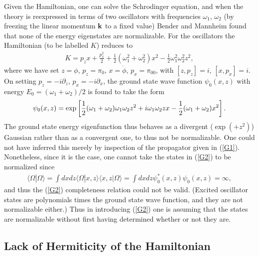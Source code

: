 \documentclass[aps]{revtex4}
\begin{document}
Given the Hamiltonian, one can solve the Schrodinger equation, and when the theory is reexpressed in terms of two oscillators with frequencies $\omega_1$, $\omega_2$ (by freezing the linear momentum ${\bf k}$ to a fixed value) Bender and Mannheim found \cite{Bender2008a} that none of the energy eigenstates are normalizable. For the oscillators the Hamiltonian (to be labelled $K$) reduces to 
%
\begin{eqnarray}
K=p_zx+\frac{p_x^2}{2}+\frac{1}{2}\left(\omega_1^2+\omega_2^2 \right)x^2-\frac{1}{2}\omega_1^2\omega_2^2z^2,
\label{G9}
\end{eqnarray}
% 
where we have set  $z=\phi$, $p_z=\pi_0$, $x=\dot{\phi}$, $p_x=\pi_{00}$,  with $[z,p_z]=i$, $[x,p_x]=i$.
On setting $p_z=-i\partial_z$, $p_x=-i\partial_x$,  the ground state wave function $\psi_0(x,z)$ with energy $E_0=(\omega_1+\omega_2)/2$ is found to take the form
%
\begin{eqnarray}
\psi_0(x,z)={\rm exp}\left[\frac{1}{2}(\omega_1+\omega_2)\omega_1\omega_2
z^2+i\omega_1\omega_2zx-\frac{1}{2}(\omega_1+\omega_2)x^2\right].
\label{G10}
\end{eqnarray}
%
The ground state energy eigenfunction thus behaves as a divergent ($\exp(+z^2)$) Gaussian rather than as a convergent one, to thus not be normalizable. One could not have inferred this merely by inspection of the propagator given in (\ref{G1}). Nonetheless, since it is the case, one cannot take the states in (\ref{G2}) to be normalized since  
%
\begin{eqnarray}
\langle\Omega|\Omega\rangle=\int dxdz\langle\Omega|x,z\rangle\langle x,z| \Omega\rangle
=\int dxdz\psi^*_0(x,z)\psi_0(x,z)=\infty,
\label{G11}
\end{eqnarray}
%
and thus the (\ref{G2}) completeness relation could not be valid. (Excited oscillator states are polynomials times the ground state wave function, and they are not normalizable either.) Thus in introducing (\ref{G2}) one is assuming that the states are normalizable without first having determined whether or not they are. 

\subsection{Lack of Hermiticity of the Hamiltonian}
\end{document}
